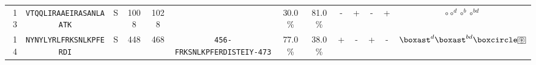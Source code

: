 \begin{tabular}{rcccccccccccc}
13 &  \texttt{VTQQLIRAAEIRASANLAATK} &       S &   1008 &  1028 &                                                                  &                          30.0\% &                           81.0\% &          - &           + &          - &           + &                                                                                               $ \circ \circ^d \circ^b \circ^{bd} $ \\
14 &  \texttt{NYNYLYRLFRKSNLKPFERDI} &       S &    448 &   468 &  \texttt{{\scriptsize 456-}FRKSNLKPFERDISTEIY{\scriptsize -473}} &                          77.0\% &                           38.0\% &          + &           - &          + &           - &                                              $ \boxast^d \boxast^{bd} \boxcircle \setlength{\fboxsep}{0.5pt} \boxed{\circledast} $ \\
\bottomrule
\end{tabular}
